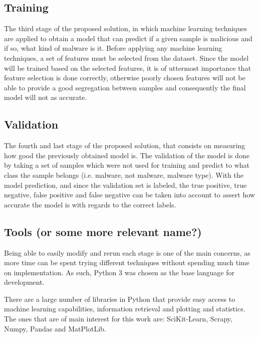 \documentclass{llncs}
\begin{document}
\subsection{Training}
The third stage of the proposed solution, in which machine learning techniques are applied to obtain a model that can predict if a given sample is malicious and if so, what kind of malware is it. Before applying any machine learning techniques, a set of features must be selected from the dataset. Since the model will be trained based on the selected features, it is of uttermost importance that feature selection is done correctly, otherwise poorly chosen features will not be able to provide a good segregation between samples and consequently the final model will not as accurate.


\subsection{Validation}
The fourth and last stage of the proposed solution, that consists on measuring how good the previously obtained model is. The validation of the model is done by taking a set of samples which were not used for training and predict to what class the sample belongs (i.e. malware, not malware, malware type). With the model prediction, and since the validation set is labeled, the true positive, true negative, false positive and false negative can be taken into account to assert how accurate the model is with regards to the correct labels.


\subsection{Tools (or some more relevant name?)}
Being able to easily modify and rerun each stage is one of the main concerns, as more time can be spent trying different techniques without spending much time on implementation. As such, Python 3 was chosen as the base language for development.

There are a large number of libraries in Python that provide easy access to machine learning capabilities, information retrieval and plotting and statistics. The ones that are of main interest for this work are: SciKit-Learn, Scrapy, Numpy, Pandas and MatPlotLib.
\end{document}
